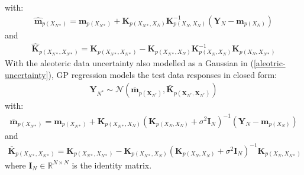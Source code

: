 \documentclass{article}
\numberwithin{equation}{section}
\begin{document}
with:
\begin{align}
    \label{gp-epistemic-posterior-mean}
    \hat{\mathbf{m}}_{p(X_{N*})} = \mathbf{m}_{p(X_{N*})} + \mathbf{K}_{p(X_{N*}, X_N)} \mathbf{K}_{p(X_N, X_N)}^{-1} \left( \mathbf{Y}_N - \mathbf{m}_{p(X_N)}\right)
\end{align}
and
\begin{align}
    \label{gp-epistemic-posterior-covariance}
    \hat{\mathbf{K}}_{p(X_{N*}, X_{N*})} = \mathbf{K}_{p(X_{N*}, X_{N*})} - \mathbf{K}_{p(X_{N*}, X_N)}\mathbf{K}_{p(X_N, X_N)}^{-1}\mathbf{K}_{p(X_N, X_{N*})}
\end{align}
With the aleoteric data uncertainty also modelled as a Gaussian in (\ref{aleotric-uncertainty}), GP regression models the test data responses in closed form:
\begin{align}
    \mathbf{Y}_{N^*} \sim \mathcal{N}\left(\bar{\mathbf{m}}_{p(\mathbf{X}_{N^*})}, \bar{\mathbf{K}}_{p(\mathbf{X}_{N^*}, \mathbf{X}_{N^*})}\right)
    \label{gp-posterior}
\end{align}
with:
\begin{align}
    \label{gp-posterior-mean}
    \bar{\mathbf{m}}_{p(X_{N*})} = \mathbf{m}_{p(X_{N*})} + \mathbf{K}_{p(X_{N*}, X_N)} \left( \mathbf{K}_{p(X_N, X_N)} + \sigma^2 \mathbf{I}_N\right)^{-1} \left( \mathbf{Y}_N - \mathbf{m}_{p(X_N)}\right)
\end{align}
and
\begin{align}
    \label{gp-posterior-covariance}
    \bar{\mathbf{K}}_{p(X_{N*}, X_{N*})} = \mathbf{K}_{p(X_{N*}, X_{N*})} - \mathbf{K}_{p(X_{N*}, X_N)}\left( \mathbf{K}_{p(X_N, X_N)} + \sigma^2 \mathbf{I}_N\right)^{-1}\mathbf{K}_{p(X_N, X_{N*})}
\end{align}
where $\mathbf{I}_N \in \mathbb{R}^{N \times N}$ is the identity matrix.
\end{document}
